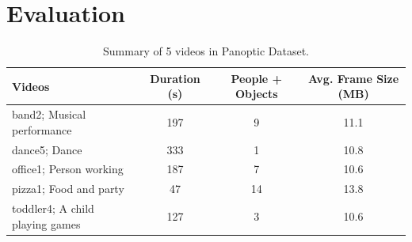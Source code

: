 \section{Evaluation}
\label{s:evaluation}


\begin{table}[t]
\centering
  {
  \begin{tabular}{|l|c|c|c|}
    \hline
    \textbf{Videos} & \textbf{Duration (s)} & \textbf{People + Objects} & \textbf{Avg. Frame Size (MB)} \\ \hline
    band2; Musical performance & 197 & 9 & 11.1 \\ \hline
    dance5; Dance & 333 & 1 & 10.8 \\ \hline
    office1; Person working & 187 & 7 & 10.6 \\ \hline
    pizza1; Food and party & 47 & 14 & 13.8 \\ \hline
    toddler4; A child playing games & 127 & 3 & 10.6 \\ \hline
    \end{tabular}
  }
\caption{Summary of 5 videos in Panoptic Dataset.}
\label{tab:dataset-summary}
\end{table}

